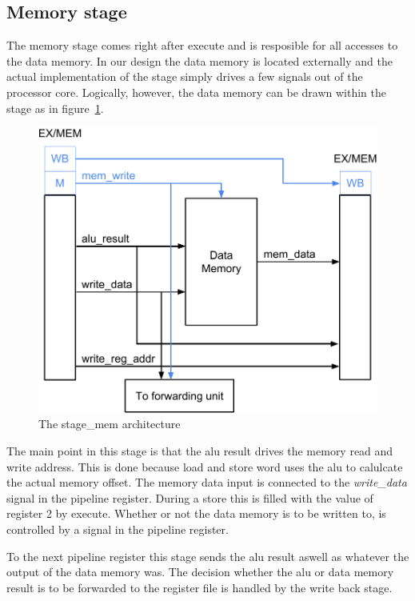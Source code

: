 \subsection{Memory stage} 
\label{section:stage_mem}

The memory stage comes right after execute and is resposible for all accesses
to the data memory. In our design the data memory is located externally and 
the actual implementation of the stage simply drives a few signals out of 
the processor core. Logically, however, the data memory can be drawn within the
stage as in figure~\ref{fig:stage_mem}.

\begin{figure}[h]
        \centering\includegraphics[scale=0.5]{figures/stage_mem}
        \caption{The stage\_mem architecture}
        \label{fig:stage_mem}
\end{figure}

The main point in this stage is that the alu result drives the memory read and
write address. This is done because load and store word uses the alu to calulcate
the actual memory offset. The memory data input is connected to the \emph{write\_data}
signal in the pipeline register. During a store this is filled with the value of
register 2 by execute. Whether or not the data memory is to be written to, is 
controlled by a signal in the pipeline register.

To the next pipeline register this stage sends the alu result aswell as whatever
the output of the data memory was. The decision whether the alu or data memory 
result is to be forwarded to the register file is handled by the write back stage.
